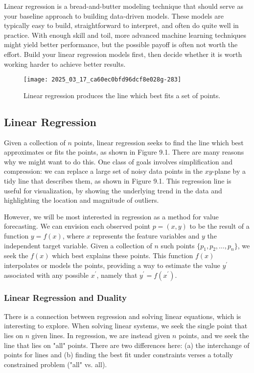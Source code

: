 \documentclass[10pt]{article}
\begin{document}
Linear regression is a bread-and-butter modeling technique that should serve as your baseline approach to building data-driven models. These models are typically easy to build, straightforward to interpret, and often do quite well in practice. With enough skill and toil, more advanced machine learning techniques might yield better performance, but the possible payoff is often not worth the effort. Build your linear regression models first, then decide whether it is worth working harder to achieve better results.

\begin{figure}[h]
    \centering
    \texttt{[image: 2025\_03\_17\_ca60ec0bfd96dcf8e028g-283]}
    \caption{Linear regression produces the line which best fits a set of points.}
\end{figure}

\subsection{Linear Regression}
Given a collection of $n$ points, linear regression seeks to find the line which best approximates or fits the points, as shown in Figure 9.1. There are many reasons why we might want to do this. One class of goals involves simplification and compression: we can replace a large set of noisy data points in the $xy$-plane by a tidy line that describes them, as shown in Figure 9.1. This regression line is useful for visualization, by showing the underlying trend in the data and highlighting the location and magnitude of outliers.

However, we will be most interested in regression as a method for value forecasting. We can envision each observed point $p=(x, y)$ to be the result of a function $y=f(x)$, where $x$ represents the feature variables and $y$ the independent target variable. Given a collection of $n$ such points $\{p_{1}, p_{2}, \ldots, p_{n}\}$, we seek the $f(x)$ which best explains these points. This function $f(x)$ interpolates or models the points, providing a way to estimate the value $y^{\prime}$ associated with any possible $x^{\prime}$, namely that $y^{\prime}=f\left(x^{\prime}\right)$.

\subsubsection{Linear Regression and Duality}
There is a connection between regression and solving linear equations, which is interesting to explore. When solving linear systems, we seek the single point that lies on $n$ given lines. In regression, we are instead given $n$ points, and we seek the line that lies on "all" points. There are two differences here: (a) the interchange of points for lines and (b) finding the best fit under constraints verses a totally constrained problem ("all" vs. all).
\end{document}

